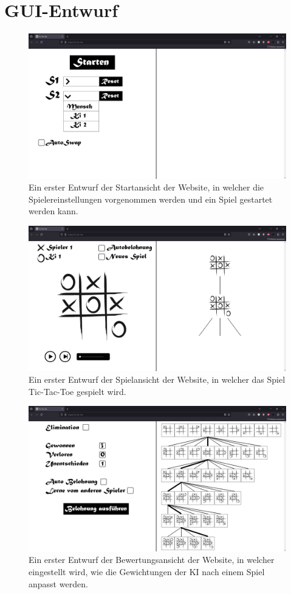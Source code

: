 \documentclass[titlepage]{scrartcl}
\begin{document}
\section{GUI-Entwurf}
\begin{figure}[ht]
\includegraphics[width=\textwidth]{tictactoe_startansicht.png}
\caption{Ein erster Entwurf der Startansicht der Website, in welcher die Spielereinstellungen vorgenommen werden und ein Spiel gestartet werden kann.}
\end{figure}

\begin{figure}[ht]
\includegraphics[width=\textwidth]{tictactoe_spielansicht.png}
\caption{Ein erster Entwurf der Spielansicht der Website, in welcher das Spiel Tic-Tac-Toe gespielt wird.}
\end{figure}

\begin{figure}[ht]
\includegraphics[width=\textwidth]{tictactoe_bewertungsansicht.png}
\caption{Ein erster Entwurf der Bewertungsansicht der Website, in welcher eingestellt wird, wie die Gewichtungen der KI nach einem Spiel anpasst werden.}
\end{figure}
\end{document}
